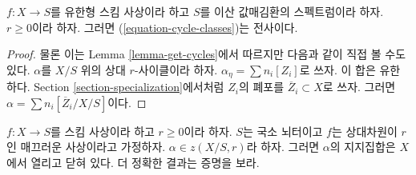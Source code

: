 \begin{lemma}
\label{lemma-get-cycles-dvr}
$f : X \to S$를 유한형 스킴 사상이라 하고 $S$를 이산 값매김환의
스펙트럼이라 하자. $r \geq 0$이라 하자. 그러면
(\ref{equation-cycle-classes})는 전사이다.
\end{lemma}

\begin{proof}
물론 이는 Lemma \ref{lemma-get-cycles}에서 따르지만 다음과 같이
직접 볼 수도 있다. $\alpha$를 $X/S$ 위의 상대 $r$-사이클이라 하자.
$\alpha_\eta = \sum n_i[Z_i]$로 쓰자. 이 합은 유한하다.
Section \ref{section-specialization}에서처럼 $Z_i$의 폐포를
$\overline{Z}_i \subset X$로 쓰자. 그러면
$\alpha = \sum n_i[\overline{Z}_i/X/S]$이다.
\end{proof}

\begin{lemma}
\label{lemma-relative-cycle-smooth}
$f : X \to S$를 스킴 사상이라 하고 $r \geq 0$이라 하자.
$S$는 국소 뇌터이고 $f$는 상대차원이 $r$인 매끄러운 사상이라고
가정하자. $\alpha \in z(X/S, r)$라 하자. 그러면 $\alpha$의
지지집합은 $X$에서 열리고 닫혀 있다. 더 정확한 결과는 증명을 보라.
\end{lemma}

